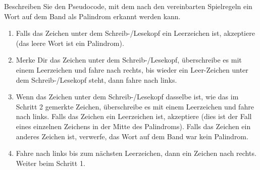 Beschreiben Sie den Pseudocode, mit dem nach den vereinbarten
Spielregeln ein Wort auf dem Band als Palindrom erkannt werden kann.

\begin{loesung}
\begin{enumerate}
\item
Falls das Zeichen unter dem Schreib-/Lesekopf ein Leerzeichen ist,
akzeptiere (das leere Wort ist ein Palindrom).
\item
Merke Dir das Zeichen unter dem Schreib-/Lesekopf, überschreibe es mit
einem Leerzeichen und fahre nach rechts, bis wieder ein Leer-Zeichen
unter dem Schreib-/Lesekopf steht, dann fahre nach links.
\item
Wenn das Zeichen unter dem Schreib-/Lesekopf dasselbe ist, wie das
im Schritt 2 gemerkte Zeichen, überschreibe es mit einem Leerzeichen
und fahre nach links.
Falls das Zeichen ein Leerzeichen ist, akzeptiere (dies ist der Fall
eines einzelnen Zeichens in der Mitte des Palindroms).
Falls das Zeichen ein anderes Zeichen ist, verwerfe, das Wort auf 
dem Band war kein Palindrom.
\item
Fahre nach links bis zum nächsten Leerzeichen, dann ein Zeichen nach rechts.
Weiter beim Schritt 1.
\qedhere
\end{enumerate}
\end{loesung}



